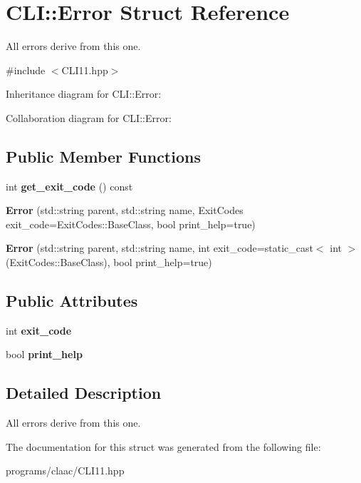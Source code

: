 \hypertarget{struct_c_l_i_1_1_error}{}\section{C\+LI\+:\+:Error Struct Reference}
\label{struct_c_l_i_1_1_error}


All errors derive from this one.  




{\ttfamily \#include $<$C\+L\+I11.\+hpp$>$}



Inheritance diagram for C\+LI\+:\+:Error\+:


Collaboration diagram for C\+LI\+:\+:Error\+:
\subsection*{Public Member Functions}
\begin{DoxyCompactItemize}
\item 
\mbox{\label{struct_c_l_i_1_1_error_a24faca884e953e6366bdb8d84d631588}} 
int {\bfseries get\+\_\+exit\+\_\+code} () const
\item 
\mbox{\label{struct_c_l_i_1_1_error_a37ba5fcde7c1aa746803532ff549ff11}} 
{\bfseries Error} (std\+::string parent, std\+::string name, Exit\+Codes exit\+\_\+code=Exit\+Codes\+::\+Base\+Class, bool print\+\_\+help=true)
\item 
\mbox{\label{struct_c_l_i_1_1_error_aeddd3f6fc72cbb6db7efae9d41b58b43}} 
{\bfseries Error} (std\+::string parent, std\+::string name, int exit\+\_\+code=static\+\_\+cast$<$ int $>$(Exit\+Codes\+::\+Base\+Class), bool print\+\_\+help=true)
\end{DoxyCompactItemize}
\subsection*{Public Attributes}
\begin{DoxyCompactItemize}
\item 
\mbox{\label{struct_c_l_i_1_1_error_ade74be0294e8a34fd8184b6c370b4b5e}} 
int {\bfseries exit\+\_\+code}
\item 
\mbox{\label{struct_c_l_i_1_1_error_a6300b3fff4116be33fe52730b575ec34}} 
bool {\bfseries print\+\_\+help}
\end{DoxyCompactItemize}


\subsection{Detailed Description}
All errors derive from this one. 

The documentation for this struct was generated from the following file\+:\begin{DoxyCompactItemize}
\item 
programs/claac/C\+L\+I11.\+hpp\end{DoxyCompactItemize}
